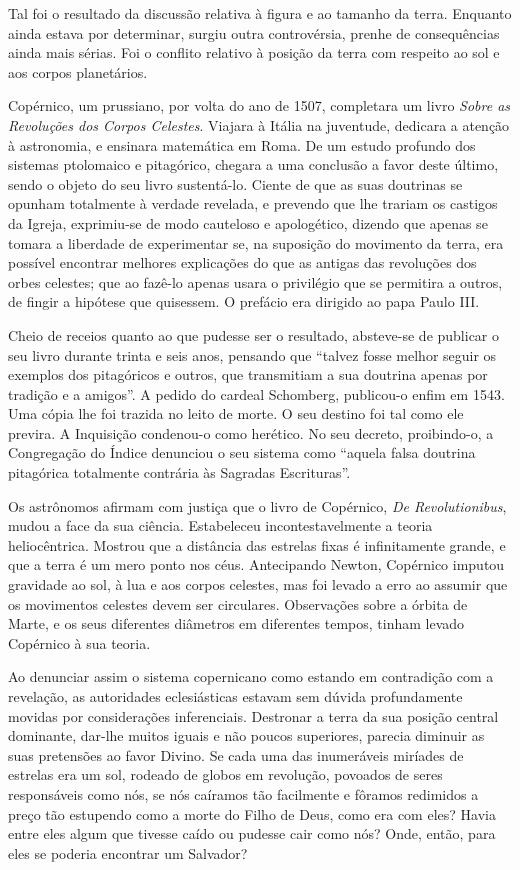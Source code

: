 \documentclass[11pt,a5paper,twoside,openany]{book}
\begin{document}
Tal foi o resultado da discussão relativa à figura e ao tamanho da terra. Enquanto ainda estava por determinar, surgiu outra controvérsia, prenhe de consequências ainda mais sérias. Foi o conflito relativo à posição da terra com respeito ao sol e aos corpos planetários.

Copérnico, um prussiano, por volta do ano de 1507, completara um livro \textit{Sobre as Revoluções dos Corpos Celestes}. Viajara à Itália na juventude, dedicara a atenção à astronomia, e ensinara matemática em Roma. De um estudo profundo dos sistemas ptolomaico e pitagórico, chegara a uma conclusão a favor deste último, sendo o objeto do seu livro sustentá-lo. Ciente de que as suas doutrinas se opunham totalmente à verdade revelada, e prevendo que lhe trariam os castigos da Igreja, exprimiu-se de modo cauteloso e apologético, dizendo que apenas se tomara a liberdade de experimentar se, na suposição do movimento da terra, era possível encontrar melhores explicações do que as antigas das revoluções dos orbes celestes; que ao fazê-lo apenas usara o privilégio que se permitira a outros, de fingir a hipótese que quisessem. O prefácio era dirigido ao papa Paulo III.

Cheio de receios quanto ao que pudesse ser o resultado, absteve-se de publicar o seu livro durante trinta e seis anos, pensando que “talvez fosse melhor seguir os exemplos dos pitagóricos e outros, que transmitiam a sua doutrina apenas por tradição e a amigos”. A pedido do cardeal Schomberg, publicou-o enfim em 1543. Uma cópia lhe foi trazida no leito de morte. O seu destino foi tal como ele previra. A Inquisição condenou-o como herético. No seu decreto, proibindo-o, a Congregação do Índice denunciou o seu sistema como “aquela falsa doutrina pitagórica totalmente contrária às Sagradas Escrituras”.

Os astrônomos afirmam com justiça que o livro de Copérnico, \textit{De Revolutionibus}, mudou a face da sua ciência. Estabeleceu incontestavelmente a teoria heliocêntrica. Mostrou que a distância das estrelas fixas é infinitamente grande, e que a terra é um mero ponto nos céus. Antecipando Newton, Copérnico imputou gravidade ao sol, à lua e aos corpos celestes, mas foi levado a erro ao assumir que os movimentos celestes devem ser circulares. Observações sobre a órbita de Marte, e os seus diferentes diâmetros em diferentes tempos, tinham levado Copérnico à sua teoria.

Ao denunciar assim o sistema copernicano como estando em contradição com a revelação, as autoridades eclesiásticas estavam sem dúvida profundamente movidas por considerações inferenciais. Destronar a terra da sua posição central dominante, dar-lhe muitos iguais e não poucos superiores, parecia diminuir as suas pretensões ao favor Divino. Se cada uma das inumeráveis miríades de estrelas era um sol, rodeado de globos em revolução, povoados de seres responsáveis como nós, se nós caíramos tão facilmente e fôramos redimidos a preço tão estupendo como a morte do Filho de Deus, como era com eles? Havia entre eles algum que tivesse caído ou pudesse cair como nós? Onde, então, para eles se poderia encontrar um Salvador?
\end{document}

